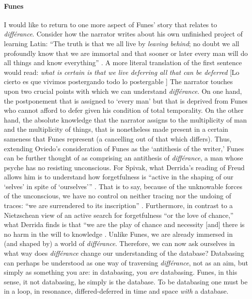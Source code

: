 \paragraph{Funes}
I would like to return to one more aspect of Funes' story that relates to \textit{différance}. Consider how the narrator writes about his own unfinished project of learning Latin: ``The truth is that we all live by \textit{leaving behind}; no doubt we all profoundly know that we are immortal and that sooner or later every man will do all things and know everything'' \im \parencite[113]{Ker94:Fun}. A more literal translation of the first sentence would read: \textit{what is certain is that we live deferring all that can be deferred} [Lo cierto es que vivimos postergando todo lo postergable \parencite{Bor42:Fun}] The narrator touches upon two crucial points with which we can understand \textit{différance}. On one hand, the postponement that is assigned to `every man' but that is deprived from Funes who cannot afford to defer given his condition of total temporality. On the other hand, the absolute knowledge that the narrator assigns to the multiplicity of man and the multiplicity of things, that is nonetheless made present in a certain sameness that Funes represent (a cancelling out of that which differs). Thus, extending Oviedo's consideration of Funes as the `antithesis of the writer,' Funes can be further thought of as comprising an antithesis of \textit{différance}, a man whose psyche has no resisting unconscious. For Spivak, what Derrida's reading of Freud allows him is to understand how forgetfulness is ``active in the shaping of our `selves' in spite of `ourselves''' \parencite[xlv]{Der76:Of}. That is to say, because of the unknowable forces of the unconscious, we have no control on neither tracing nor the undoing of traces: ``we are surrendered to its inscription'' \parencite[xlv]{Der76:Of}. Furthermore, in contrast to a Nietzschean view of an active search for forgetfulness ``or the love of chance,'' what Derrida finds is that ``we are the play of chance and necessity [and] there is no harm in the will to knowledge \parencite[xliv]{Der76:Of}. Unlike Funes, we are already immersed in (and shaped by) a world of \textit{différance}. Therefore, we can now ask ourselves in what way does \textit{différance} change our understanding of the database? Databasing can perhaps be understood as one way of traversing \textit{différance}, not as an aim, but simply as something you are: in databasing, you \textit{are} databasing. Funes, in this sense, it not databasing, he simply is the database. To be databasing one must be in a loop, in resonance, differed-deferred in time and space \textit{with} a database.


